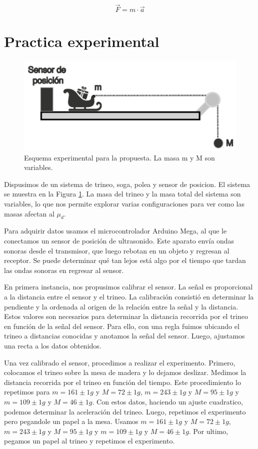\documentclass[12pt,a4]{article}
\begin{document}
\[
\vec{F} = m \cdot \vec{a}
\]

\section{Practica experimental}

\begin{figure}[H]
    \centering
    \includegraphics[width=0.9\linewidth]{esquema.png}
    \caption{Esquema experimental para la propuesta. La masa m y M son variables.}
    \label{fig:system}
\end{figure}

Dispusimos de un sistema de trineo, soga, polea y sensor de posicion. El sistema se muestra en la Figura \ref{fig:system}. La masa del trineo y la masa total del sistema son variables, lo que nos permite explorar varias configuraciones para ver como las masas afectan al $\mu_d$.

Para adquirir datos usamos el microcontrolador Arduino Mega, al que le conectamos un
sensor de posición de ultrasonido. Este aparato envía ondas sonoras desde el transmisor, que luego rebotan
en un objeto y regresan al receptor. Se puede determinar qué tan lejos está algo por el tiempo que tardan las
ondas sonoras en regresar al sensor.

En primera instancia, nos propusimos calibrar el sensor. La señal es proporcional a la distancia entre el sensor y el trineo. La calibración consistió en determinar la pendiente y la ordenada al origen de la relación entre la señal y la distancia. Estos valores son necesarios para determinar la distancia recorrida por el trineo en función de la señal del sensor. Para ello, con una regla fuimos ubicando el trineo a distancias conocidas y anotamos la señal del sensor. Luego, ajustamos una recta a los datos obtenidos.

Una vez calibrado el sensor, procedimos a realizar el experimento. Primero, colocamos el trineo sobre la mesa de madera y lo dejamos deslizar. Medimos la distancia recorrida por el trineo en función del tiempo. Este procedimiento lo repetimos para $m = 161 \pm 1 g$ y $M = 72 \pm 1 g$, $m = 243 \pm 1 g$ y $M = 95 \pm 1 g$ y $m = 109 \pm 1 g$ y $M = 46 \pm 1 g$. Con estos datos, haciendo un ajuste cuadratico, podemos determinar la aceleración del trineo. 
Luego, repetimos el experimento pero pegandole un papel a la mesa. Usamos $m = 161 \pm 1 g$ y $M = 72 \pm 1 g$, $m = 243 \pm 1 g$ y $M = 95 \pm 1 g$ y $m = 109 \pm 1 g$ y $M = 46 \pm 1 g$. 
Por ultimo, pegamos un papel al trineo y repetimos el experimento.
\end{document}
